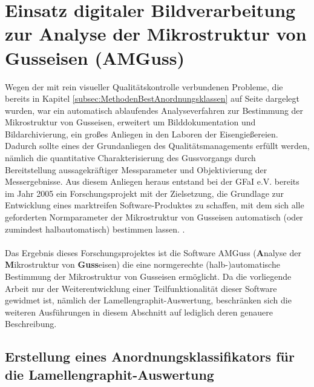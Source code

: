 \documentclass[
fontsize=10pt, 
listof = totoc,
parskip = half	
]{report}
\begin{document}
\section{Einsatz digitaler Bildverarbeitung zur Analyse der Mikrostruktur von Gusseisen (AMGuss)}
\label{sec:BestimmungMikrostrukturAMGuss}
Wegen der mit rein visueller Qualitätskontrolle verbundenen Probleme, die bereits in Kapitel \ref{subsec:MethodenBestAnordnungsklassen} auf Seite \pageref{subsec:MethodenBestAnordnungsklassen} dargelegt wurden, war ein automatisch ablaufendes Analyseverfahren zur Bestimmung der Mikrostruktur von Gusseisen, erweitert um Bilddokumentation und Bildarchivierung, ein großes Anliegen in den Laboren der Eisengießereien. Dadurch sollte eines der Grundanliegen des Qualitätsmanagements erfüllt werden, nämlich die quantitative Charakterisierung des Gussvorgangs durch Bereitstellung aussagekräftiger Messparameter und Objektivierung der Messergebnisse. Aus diesem Anliegen heraus entstand bei der GFaI e.V. bereits im Jahr 2005 ein Forschungsprojekt mit der Zielsetzung, die Grundlage zur Entwicklung eines marktreifen Software-Produktes zu schaffen, mit dem sich alle geforderten Normparameter der Mikrostruktur von Gusseisen automatisch (oder zumindest halbautomatisch) bestimmen lassen. \cite{AMGuss2007}.
\\\\
Das Ergebnis dieses Forschungsprojektes ist die Software AMGuss (\textbf{A}nalyse der \textbf{M}ikrostruktur von \textbf{Guss}eisen) die eine normgerechte (halb-)automatische Bestimmung der Mikrostruktur von Gusseisen ermöglicht. Da die vorliegende Arbeit nur der Weiterentwicklung einer Teilfunktionalität dieser Software gewidmet ist, nämlich der Lamellengraphit-Auswertung, beschränken sich die weiteren Ausführungen in diesem Abschnitt auf lediglich deren genauere Beschreibung. 

\subsection{Erstellung eines Anordnungsklassifikators für die Lamellengraphit-Auswertung}
\label{subsec: ErstellungAnordnungsklassifAMGuss}
\end{document}
